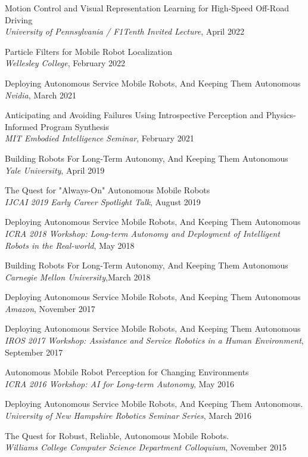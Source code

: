 \documentclass[Times]{article}
\begin{document}
Motion Control and Visual Representation Learning for High-Speed Off-Road Driving
\\
{\em University of Pennsylvania / F1Tenth Invited Lecture}, April 2022

Particle Filters for Mobile Robot Localization
\\
{\em Wellesley College}, February 2022

Deploying Autonomous Service Mobile Robots, And Keeping Them Autonomous
\\
{\em Nvidia}, March 2021

Anticipating and Avoiding Failures Using Introspective Perception and Physics-Informed Program Synthesis\\
{\em MIT Embodied Intelligence Seminar}, February 2021

Building Robots For Long-Term Autonomy, And Keeping Them Autonomous\\
{\em Yale University}, April 2019

The Quest for "Always-On" Autonomous Mobile Robots\\
{\em IJCAI 2019 Early Career Spotlight Talk}, August 2019

Deploying Autonomous Service Mobile Robots, And Keeping Them Autonomous\\
{\em ICRA 2018 Workshop: Long-term Autonomy and Deployment of Intelligent Robots
in the Real-world}, May 2018

Building Robots For Long-Term Autonomy, And Keeping Them Autonomous\\
{\em Carnegie Mellon University},March 2018

Deploying Autonomous Service Mobile Robots, And Keeping Them Autonomous\\
{\em Amazon}, November 2017

Deploying Autonomous Service Mobile Robots, And Keeping Them Autonomous\\
{\em IROS 2017 Workshop: Assistance and Service Robotics in a Human
Environment}, September 2017

Autonomous Mobile Robot Perception for Changing Environments\\
{\em ICRA 2016 Workshop: AI for Long-term Autonomy}, May 2016

Deploying Autonomous Service Mobile Robots, And Keeping Them Autonomous.\\
{\em University of New Hampshire Robotics Seminar Series}, March 2016

The Quest for Robust, Reliable, Autonomous Mobile Robots.\\
{\em Williams College Computer Science Department Colloquium}, November 2015
\end{document}
